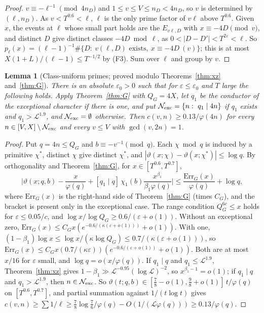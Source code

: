 \documentclass[11pt,reqno]{amsart}
\newtheorem{lemma}[theorem]{Lemma}
\theoremstyle{definition}
\newcommand{\Lc}{\mathcal L}
\begin{document}
\begin{proof}
$v\equiv-\ell^{-1}\pmod{4n_D}$ and $1\le v\le V\le n_D<4n_D$, so $v$ is determined by
$(\ell,n_D)$.  As $v<T^{0.6}<\ell$, $\ell$ is the only prime factor of $v\ell$ above
$T^{0.6}$.  Given $x$, the events at $\ell$ whose small part holds are the
$E_{v\ell,D}$ with $x\equiv-4D\pmod v$, and distinct $D$ give distinct classes
$-4D\bmod\ell$, as $0<|D-D'|<T^{2\varepsilon}<\ell$.  So
$p_\ell(x)=(\ell-1)^{-1}\#\{D:\ v(\ell,D)\text{ exists},\ x\equiv-4D\ (v)\}$; this is at
most $X(1+L)/(\ell-1)\le T^{-1/2}$ by (F3).  Sum over $\ell$ and group by $v$.
\end{proof}

\begin{lemma}[Class-uniform primes; proved modulo Theorems~\ref{thm:xz} and~\ref{thm:G}]\label{lem:cuprimes}
There is an absolute $\varepsilon_0>0$ such that for $\varepsilon\le\varepsilon_0$ and $T$ large the
following holds.  Apply Theorem~\ref{thm:G} with $Q_G=4X$, let $q_1$ be the
conductor of the exceptional character if there is one, and put
$\mathcal N_{\rm exc}=\{n:\ q_1\mid4n\}$ if $q_1$ exists and $q_1>\Lc^{1.9}$, and
$\mathcal N_{\rm exc}=\emptyset$ otherwise.  Then $c(v,n)\ge0.13/\varphi(4n)$ for every
$n\in[V,X]\setminus\mathcal N_{\rm exc}$ and every $v\le V$ with $\gcd(v,2n)=1$.
\end{lemma}

\begin{proof}
Put $q=4n\le Q_G$ and $b\equiv-v^{-1}\pmod q$.  Each $\chi\bmod q$ is induced by a
primitive $\chi^*$, distinct $\chi$ give distinct $\chi^*$, and
$|\vartheta(x;\chi)-\vartheta(x;\chi^*)|\le\log q$.  By orthogonality and
Theorem~\ref{thm:G}, for $x\in[T^{0.6},T^{0.7}]$,
\[
 \Big|\vartheta(x;q,b)-\frac x{\varphi(q)}+[q_1\mid q]\,\chi_1(b)\frac{x^{\beta_1}}{\beta_1\varphi(q)}\Big|\le\frac{\mathrm{Err}_G(x)}{\varphi(q)}+\log q,
\]
where $\mathrm{Err}_G(x)$ is the right-hand side of Theorem~\ref{thm:G} (times
$C_G$), and the bracket is present only in the exceptional case.  The range
condition $Q_G^{6c}\le x$ holds for $\varepsilon\le0.05/c$, and
$\log x/\log Q_G\ge0.6/(\varepsilon+o(1))$.  Without an exceptional zero,
$\mathrm{Err}_G(x)\le C_Gx(e^{-0.6/(\kappa(\varepsilon+o(1)))}+o(1))$.  With one,
$(1-\beta_1)\log x\le\log x/(\kappa\log Q_G)\le0.7/(\kappa(\varepsilon+o(1)))$, so
$\mathrm{Err}_G(x)\le C_Gx(0.7/(\kappa\varepsilon))(e^{-0.6/(\varepsilon+o(1))}+o(1))$.  Both are at most
$x/16$ for $\varepsilon$ small, and $\log q=o(x/\varphi(q))$.  If $q_1\mid q$ and
$q_1\le\Lc^{1.9}$, Theorem~\ref{thm:xz} gives $1-\beta_1\gg\Lc^{-0.95}(\log\Lc)^{-2}$, so
$x^{\beta_1-1}=o(1)$; if $q_1\mid q$ and $q_1>\Lc^{1.9}$, then $n\in\mathcal N_{\rm exc}$.  So
$\vartheta(t;q,b)\in[\frac78-o(1),\frac98+o(1)]\,t/\varphi(q)$ on $[T^{0.6},T^{0.7}]$, and
partial summation against $1/(t\log t)$ gives
$c(v,n)\ge\sum1/\ell\ge\frac78\log\frac76/\varphi(q)-O(1/(\Lc\varphi(q)))\ge0.13/\varphi(q)$.
\end{proof}
\end{document}
